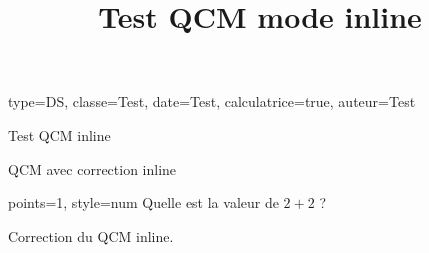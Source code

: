 \documentclass[correction]{nfdevoirs}
\title{Test QCM mode inline}
\begin{document}
\begin{devoir}{
    type=DS,
    classe={Test},
    date={Test},
    calculatrice=true,
    auteur={Test}
}

\begin{partie}{Test QCM inline}

    \begin{exercice}{QCM avec correction inline}

        \begin{qcm}{points=1, style=num}
            Quelle est la valeur de $2+2$ ?
            \begin{choix}
            \end{choix}
        \end{qcm}

        \begin{correction}
            Correction du QCM inline.
        \end{correction}

    \end{exercice}

\end{partie}

\end{devoir}
\end{document}
